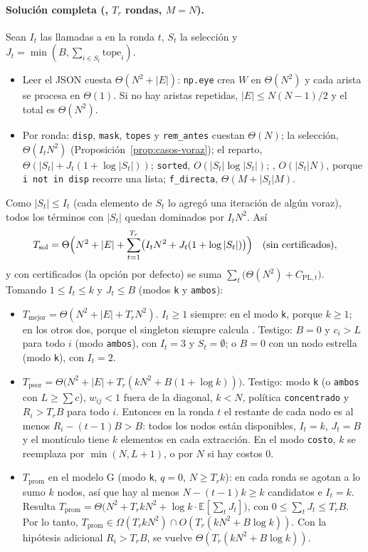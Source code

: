 \paragraph{Solución completa (, $T_r$ rondas, $M=N$).} Sean $I_t$ las llamadas a  en la ronda $t$, $S_t$ la selección y $J_t=\min(B,\sum_{i\in S_t}\text{tope}_i)$.
\begin{itemize}[nosep]
\item Leer el JSON cuesta $\Theta(N^2+|E|)$: \texttt{np.eye} crea $W$ en $\Theta(N^2)$ y cada arista se procesa en $\Theta(1)$. Si no hay aristas repetidas, $|E|\le N(N-1)/2$ y el total es $\Theta(N^2)$.
\item Por ronda: \texttt{disp}, \texttt{mask}, \texttt{topes} y \texttt{rem\_antes} cuestan $\Theta(N)$; la selección, $\Theta(I_t N^2)$ (Proposición~\ref{prop:casos-voraz}); el reparto, $\Theta(|S_t|+J_t(1+\log|S_t|))$; \texttt{sorted}, $O(|S_t|\log|S_t|)$; , $O(|S_t|N)$, porque \texttt{i not in disp} recorre una lista; \texttt{f\_directa}, $\Theta(M+|S_t|M)$.
\end{itemize}
Como $|S_t|\le I_t$ (cada elemento de $S_t$ lo agregó una iteración de algún voraz), todos los términos con $|S_t|$ quedan dominados por $I_tN^2$. Así
\[
T_{\text{sol}}=\Theta\Bigl(N^2+|E|+\sum_{t=1}^{T_r}\bigl(I_tN^2+J_t(1+\log|S_t|)\bigr)\Bigr)\quad(\text{sin certificados}),
\]
y con certificados (la opción por defecto) se suma $\sum_t\bigl(\Theta(N^2)+C_{\text{PL},t}\bigr)$. Tomando $1\le I_t\le k$ y $J_t\le B$ (modos \texttt{k} y \texttt{ambos}):
\begin{itemize}[nosep]
\item $T_{\text{mejor}}=\Theta(N^2+|E|+T_rN^2)$. $I_t\ge1$ siempre: en el modo \texttt{k}, porque $k\ge1$; en los otros dos, porque el singleton siempre calcula . Testigo: $B=0$ y $c_i>L$ para todo $i$ (modo \texttt{ambos}), con $I_t=3$ y $S_t=\emptyset$; o $B=0$ con un nodo estrella (modo \texttt{k}), con $I_t=2$.
\item $T_{\text{peor}}=\Theta\bigl(N^2+|E|+T_r(kN^2+B(1+\log k))\bigr)$. Testigo: modo \texttt{k} (o \texttt{ambos} con $L\ge\sum c$), $w_{ij}<1$ fuera de la diagonal, $k<N$, política \texttt{concentrado} y $R_i>T_rB$ para todo $i$. Entonces en la ronda $t$ el restante de cada nodo es al menos $R_i-(t-1)B>B$: todos los nodos están disponibles, $I_t=k$, $J_t=B$ y el montículo tiene $k$ elementos en cada extracción. En el modo \texttt{costo}, $k$ se reemplaza por $\min(N,L+1)$, o por $N$ si hay costos $0$.
\item $T_{\text{prom}}$ en el modelo G (modo \texttt{k}, $q=0$, $N\ge T_rk$): en cada ronda se agotan a lo sumo $k$ nodos, así que hay al menos $N-(t-1)k\ge k$ candidatos e $I_t=k$. Resulta $T_{\text{prom}}=\Theta\bigl(N^2+T_rkN^2+\log k\cdot\mathbb E[\sum_tJ_t]\bigr)$, con $0\le\sum_tJ_t\le T_rB$. Por lo tanto, $T_{\text{prom}}\in\Omega(T_rkN^2)\cap O(T_r(kN^2+B\log k))$. Con la hipótesis adicional $R_i>T_rB$, se vuelve $\Theta(T_r(kN^2+B\log k))$.
\end{itemize}
